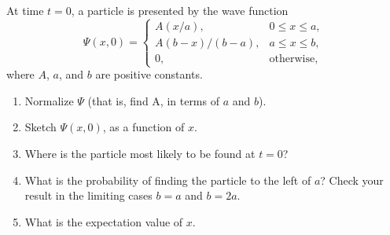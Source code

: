 \documentclass[en, oneside]{vivi}
\begin{document}
\begin{prob}
    At time $t = 0$, a particle is presented by the wave function
    \begin{equation*}
        \Psi (x, 0) = \begin{cases}
            A (x/a), & 0 \leq x \leq a,\\
            A (b - x)/(b - a), & a \leq x \leq b,\\
            0, & \text{otherwise},
        \end{cases}
    \end{equation*}
    where $A$, $a$, and $b$ are positive constants.
    \begin{enumerate}[label=(\alph*)]
        \item Normalize $\Psi$ (that is, find A, in terms of $a$ and $b$).
        \item Sketch $\Psi (x, 0)$, as a function of $x$.
        \item Where is the particle most likely to be found at $t = 0$?
        \item What is the probability of finding the particle to the left of $a$? Check your result in the limiting cases $b = a$ and $b = 2a$.
        \item What is the expectation value of $x$.
    \end{enumerate}
\end{prob}
\end{document}
